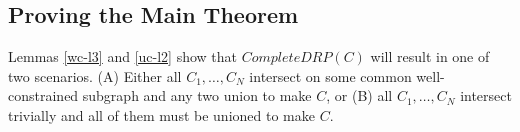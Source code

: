 \documentclass[11pt]{article}
\begin{document}


\subsection{Proving the Main Theorem}
Lemmas \ref{wc-l3} and \ref{uc-l2} show that $CompleteDRP(C)$ will result in one of two scenarios. (A) Either all $C_1,\ldots,C_N$ intersect on some common well-constrained subgraph and any two union to make $C$, or (B) all $C_1,\ldots,C_N$ intersect trivially and all of them must be unioned to make $C$.













\end{document}
